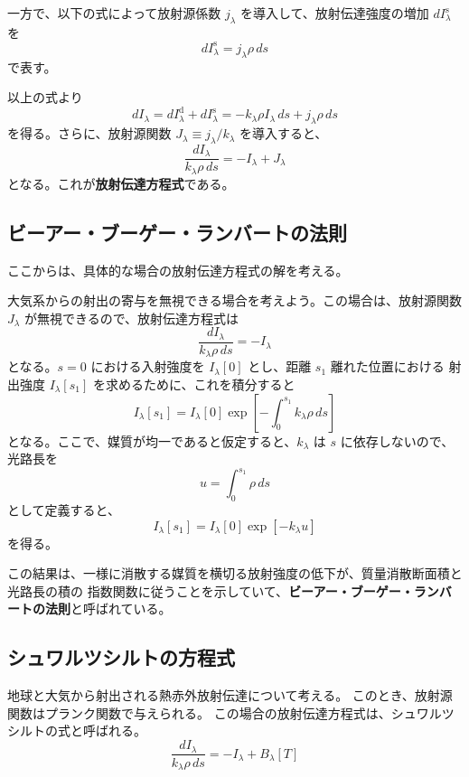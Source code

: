 \documentclass[book]{dennou777}
\newcommand{\hmemph}[1]{\textbf{#1}}
\begin{document}
一方で、以下の式によって放射源係数 \(j_\lambda\) を導入して、放射伝達強度の増加
\(dI_\lambda^\mathrm{s}\) を
\begin{equation}
	dI_\lambda^\mathrm{s}=j_\lambda\rho\,ds
\end{equation}
で表す。

以上の式より
\begin{equation}
	dI_\lambda=dI_\lambda^\mathrm{d}+dI_\lambda^\mathrm{s}
	=-k_\lambda\rho I_\lambda\,ds+j_\lambda\rho\,ds
\end{equation}
を得る。さらに、放射源関数 \(J_\lambda\equiv j_\lambda/k_\lambda\) を導入すると、
\begin{equation}
	\frac{dI_\lambda}{k_\lambda\rho\,ds}=-I_\lambda+J_\lambda
\end{equation}
となる。これが\hmemph{放射伝達方程式}である。

\subsection{ビーアー・ブーゲー・ランバートの法則}
ここからは、具体的な場合の放射伝達方程式の解を考える。

大気系からの射出の寄与を無視できる場合を考えよう。この場合は、放射源関数 \(J_\lambda\)
が無視できるので、放射伝達方程式は
\begin{equation}
	\frac{dI_\lambda}{k_\lambda\rho\,ds}=-I_\lambda
\end{equation}
となる。\(s=0\) における入射強度を \(I_\lambda[0]\) とし、距離 \(s_1\) 離れた位置における
射出強度 \(I_\lambda[s_1]\) を求めるために、これを積分すると
\begin{equation}
	I_\lambda[s_1]=I_\lambda[0]\exp[-\int^{s_1}_0 k_\lambda\rho\,ds]
\end{equation}
となる。ここで、媒質が均一であると仮定すると、\(k_\lambda\) は \(s\) に依存しないので、光路長を
\begin{equation}
	u=\int^{s_1}_0\rho\,ds
\end{equation}
として定義すると、
\begin{equation}
	I_\lambda[s_1]=I_\lambda[0]\exp[-k_\lambda u]
\end{equation}
を得る。

この結果は、一様に消散する媒質を横切る放射強度の低下が、質量消散断面積と光路長の積の
指数関数に従うことを示していて、\hmemph{ビーアー・ブーゲー・ランバートの法則}と呼ばれている。


\subsection{シュワルツシルトの方程式}
地球と大気から射出される熱赤外放射伝達について考える。
このとき、放射源関数はプランク関数で与えられる。
この場合の放射伝達方程式は、シュワルツシルトの式と呼ばれる。
\begin{equation}
	\frac{dI_\lambda}{k_\lambda\rho\,ds}=-I_\lambda+B_\lambda[T]
\end{equation}
\end{document}
